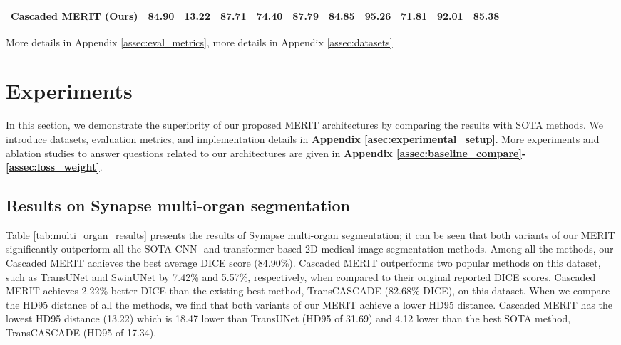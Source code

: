 \documentclass{midl}
\begin{document}
\begin{table*}[t]
{\begin{adjustbox}{width=1\textwidth}
{\begin{tabular}{lrrrrrrrrrr}
Cascaded MERIT (Ours)                   & \textbf{84.90}                    & \textbf{13.22}                    & 87.71                                      & \textbf{74.40}                                   & \textbf{87.79}                                       & \textbf{84.85}                                        & 95.26                                      & \textbf{71.81}                                   &  \textbf{92.01}                                    & \textbf{85.38}                                   \\
\bottomrule \end{tabular}}
\end{adjustbox}
}\footnotesize{ More details in Appendix \ref{assec:eval_metrics},  more details in Appendix \ref{assec:datasets}}\\
\vspace{-0.3cm}
\end{table*}

\section{Experiments}
In this section, we demonstrate the superiority of our proposed MERIT architectures by comparing the results with SOTA methods. We introduce datasets, evaluation metrics, and implementation details in \textbf{Appendix \ref{asec:experimental_setup}}. More experiments and ablation studies to answer questions related to our architectures are given in \textbf{Appendix \ref{assec:baseline_compare}-\ref{assec:loss_weight}}.








\subsection{Results on Synapse multi-organ segmentation}
Table \ref{tab:multi_organ_results} presents the results of Synapse multi-organ segmentation; it can be seen that both variants of our MERIT significantly outperform all the SOTA CNN- and transformer-based 2D medical image segmentation methods. Among all the methods, our Cascaded MERIT achieves the best average DICE score (84.90\%). Cascaded MERIT outperforms two popular methods on this dataset, such as TransUNet and SwinUNet by 7.42\% and 5.57\%, respectively, when compared to their original reported DICE scores. Cascaded MERIT achieves 2.22\% better DICE than the existing best method, TransCASCADE (82.68\% DICE), on this dataset. When we compare the HD95 distance of all the methods, we find that both variants of our MERIT achieve a lower HD95 distance. Cascaded MERIT has the lowest HD95 distance (13.22) which is 18.47 lower than TransUNet (HD95 of 31.69) and 4.12 lower than the best SOTA method, TransCASCADE (HD95 of 17.34).
\end{document}
